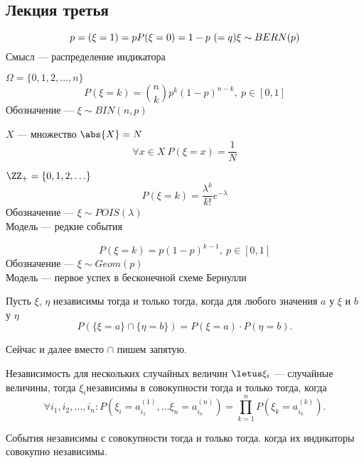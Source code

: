 \subsection{Лекция третья}

\begin{definition}
    \[p={(\xi=1)=p} \\
    P(\xi = 0)=1-p\ (=q) \\
    \xi \sim BERN(p)\]
    Смысл --- распределение индикатора
\end{definition}

\begin{definition}
    $\Omega = \{0, 1, 2, \ldots, n\}$
    \[P(\xi = k) = \binom{n}{k}p^k(1-p)^{n-k},\ p \in [0, 1]\]
    Обозначение --- $\xi \sim BIN(n, p)$
\end{definition}

\begin{definition}
    $X$ --- множество $\abs{X} = N$
    \[\forall x \in X \ P(\xi = x) = \frac{1}{N}\] 
\end{definition}

\begin{definition}
    $\ZZ_+ = \{0, 1, 2, \ldots \}$
    \[P(\xi = k) = \frac{\lambda^k}{k!}e^{-\lambda}\]
    Обозначение --- $\xi \sim POIS(\lambda)$\\
    Модель --- редкие события
\end{definition}

\begin{definition}
    \[P(\xi = k) = p(1-p)^{k-1},\ p \in [0, 1]\]
    Обозначение --- $\xi \sim Geom(p)$\\
    Модель --- первое успех в бесконечной схеме Бернулли 
\end{definition}

\begin{definition}
    Пусть $\xi$, $\eta$ независимы тогда и только тогда, когда для любого значения $a$ у $\xi$ и $b$ у $\eta$ 
    \[P(\{\xi=a\} \cap \{\eta=b\}) = P(\xi=a) \cdot P(\eta=b).\]

    \begin{remark}
        Сейчас и далее вместо $\cap$ пишем запятую.
    \end{remark}
    
    Независимость для нескольких случайных величин 
    $\letus \xi_i$ --- случайные величины, тогда $\xi_i$независимы в совокупности тогда и только тогда, когда 
    \[\forall i_1, i_2, \ldots, i_n : P(\xi_i=a_{i_1}^{(1)}, \ldots \xi_n=a_{i_n}^{(n)}) = \prod_{k=1}^n P(\xi_k=a_{i_k}^{(k)}).\]

    События независимы с совокупности тогда и только тогда. когда их индикаторы совокупно независимы.
\end{definition}

